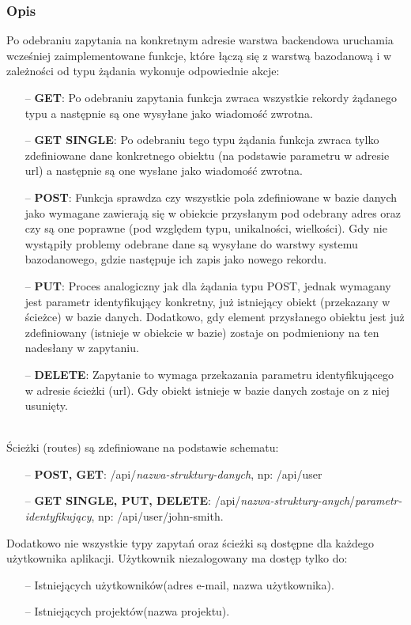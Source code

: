 \documentclass[eng,printmode]{mgr}
\begin{document}
\subsubsection{Opis}
Po odebraniu zapytania na konkretnym adresie warstwa backendowa uruchamia wcześniej zaimplementowane funkcje, które łączą się z warstwą bazodanową i w zależności od typu żądania wykonuje odpowiednie akcje:
\begin{itemize}
  \item[--] \textbf{GET}: Po odebraniu zapytania funkcja zwraca wszystkie rekordy żądanego typu a następnie są one wysyłane jako wiadomość zwrotna.
  \item[--] \textbf{GET SINGLE}: Po odebraniu tego typu żądania funkcja zwraca tylko zdefiniowane dane konkretnego obiektu (na podstawie parametru w adresie url) a następnie są one wysłane jako wiadomość zwrotna.
  \item[--] \textbf{POST}: Funkcja sprawdza czy wszystkie pola zdefiniowane w bazie danych jako wymagane zawierają się w obiekcie przysłanym pod odebrany adres oraz czy są one poprawne (pod względem typu, unikalności, wielkości). Gdy nie wystąpiły problemy odebrane dane są wysyłane do warstwy systemu bazodanowego, gdzie następuje ich zapis jako nowego rekordu.
  \item[--] \textbf{PUT}: Proces analogiczny jak dla żądania typu POST, jednak wymagany jest parametr identyfikujący konkretny, już istniejący obiekt (przekazany w ścieżce) w bazie danych. Dodatkowo, gdy element przysłanego obiektu jest już zdefiniowany (istnieje w obiekcie w bazie) zostaje on podmieniony na ten nadesłany w zapytaniu.
  \item[--] \textbf{DELETE}: Zapytanie to wymaga przekazania parametru identyfikującego w adresie ścieżki (url). Gdy obiekt istnieje w bazie danych zostaje on z niej usunięty.
\end{itemize}
\ \\
Ścieżki (routes) są zdefiniowane na podstawie schematu:
\begin{itemize}
  \item[--] \textbf{POST, GET}: /api/\textit{nazwa-struktury-danych}, np: /api/user
  \item[--] \textbf{GET SINGLE, PUT, DELETE}: /api/\textit{nazwa-struktury-anych}/\textit{parametr-identyfikujący}, np: /api/user/john-smith.
\end{itemize}
Dodatkowo nie wszystkie typy zapytań oraz ścieżki są dostępne dla każdego użytkownika aplikacji. Użytkownik niezalogowany ma dostęp tylko do:
\begin{itemize}
  \item [--] Istniejących użytkowników(adres e-mail, nazwa użytkownika).
  \item[--] Istniejących projektów(nazwa projektu).
\end{itemize}
\end{document}

